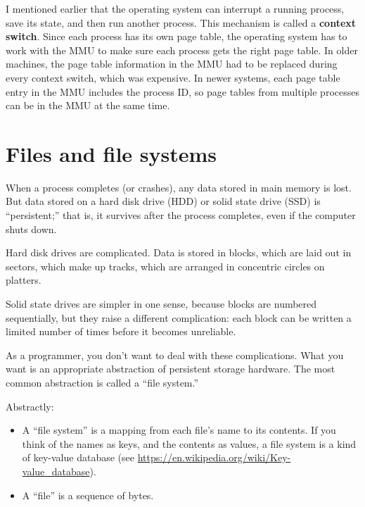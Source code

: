 \documentclass[12pt]{book}
\begin{document}
{I mentioned earlier that the operating system can interrupt a running
process, save its state, and then run another process.  This mechanism
is called a {\bf context switch}.  Since each process has its own
page table, the operating system has to work with the MMU to make
sure each process gets the right page table.  In older machines,
the page table information in the MMU had to be replaced during every
context switch, which was expensive.  In newer systems, each page
table entry in the MMU includes the process ID, so page tables from
multiple processes can be in the MMU at the same time.



\chapter{Files and file systems}

When a process completes (or crashes), any data stored in main
memory is lost.  But data stored on a hard disk drive (HDD) or
solid state drive (SSD) is ``persistent;'' that is, it survives
after the process completes, even if the computer shuts down.

Hard disk drives are complicated.  Data is stored in blocks, which
are laid out in sectors, which make up tracks, which are arranged
in concentric circles on platters.

Solid state drives are simpler in one sense, because blocks are
numbered sequentially, but they raise a different complication: each
block can be written a limited number of times before it becomes
unreliable.

As a programmer, you don't want to deal with these complications.
What you want is an appropriate abstraction of persistent storage
hardware.  The most common abstraction is called a ``file system.''

Abstractly:

\begin{itemize}

\item A ``file system'' is a mapping from each file's name to its contents.
If you think of the names as keys, and the contents as values,
a file system is a kind of key-value database
(see \url{https://en.wikipedia.org/wiki/Key-value_database}).

\item A ``file'' is a sequence of bytes.

\end{itemize}

}
\end{document}
